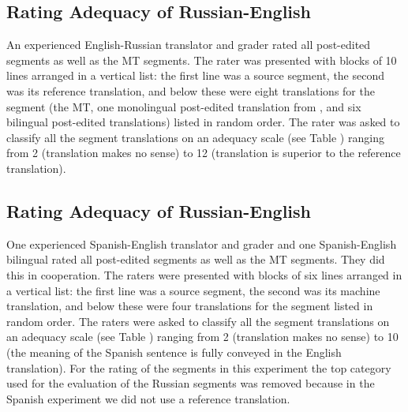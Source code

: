 







\subsection{Rating Adequacy of Russian-English}


An experienced English-Russian translator and grader rated all post-edited segments as well as the MT segments.%
%
The rater was presented with blocks of 10 lines arranged in a vertical list:
%
the first line was a source segment, 
%
the second was its reference translation, and 
%
below these were eight translations for the segment 
%
(the MT, one monolingual post-edited translation from \citet{2014_WMT_Schwartz_etal}, and six bilingual post-edited translations) 
%
listed in random order. 
%
The rater was asked to classify all the segment translations on an adequacy scale (see Table ) ranging from 2 (translation makes no sense) to 12 (translation is superior to the reference translation). 


\subsection{Rating Adequacy of Russian-English}

One experienced Spanish-English translator and grader and one Spanish-English bilingual rated all post-edited segments as well as the MT segments.
%
They did this in cooperation.
%
The raters were presented with blocks of six lines arranged in a vertical list: the first line was a source segment, the second was its machine translation, and below these were four translations for the segment listed in random order.
%
The raters were asked to classify all the segment translations on an adequacy scale (see Table ) ranging from 2 (translation makes no sense) to 10 (the meaning of the Spanish sentence is fully conveyed in the English translation). 
% 
For the rating of the segments in this experiment the top category used for the evaluation of the Russian segments was removed because in the Spanish experiment we did not use a reference translation.

